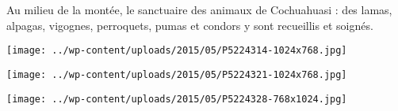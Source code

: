  

 Au milieu de la montée, le sanctuaire des animaux de Cochuahuasi : des lamas, alpagas, vigognes, perroquets, pumas et condors y sont recueillis et soignés. 

 

\begin{center} \texttt{[image: ../wp-content/uploads/2015/05/P5224314-1024x768.jpg]} \end{center}

 

 

\begin{center} \texttt{[image: ../wp-content/uploads/2015/05/P5224321-1024x768.jpg]} \end{center}

 

 

\begin{center} \texttt{[image: ../wp-content/uploads/2015/05/P5224328-768x1024.jpg]} \end{center}


 
 
